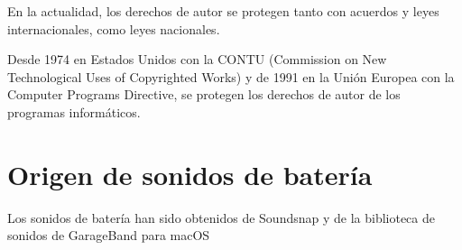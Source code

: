             En la actualidad, los derechos de autor se protegen tanto con acuerdos y leyes internacionales, como leyes
            nacionales.\newline

            Desde 1974 en Estados Unidos con la CONTU\cite{contu} (Commission on New Technological Uses of Copyrighted
            Works) y de 1991 en la Unión Europea con la Computer Programs Directive\cite{com_pro_dir}, se protegen los
            derechos de autor de los programas informáticos.

    

    \section{Origen de sonidos de batería} %
    \label{sec:OrigenDeSonidosDeBateria}

        Los sonidos de batería han sido obtenidos de Soundsnap\cite{soundsnap} y de la biblioteca de sonidos de
        GarageBand para macOS\cite{garageband}


